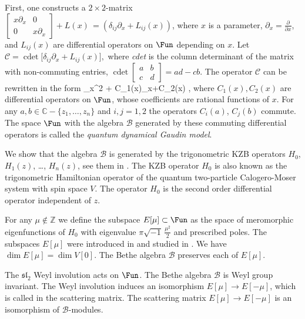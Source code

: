 \documentclass[12pt]{amsart}
\let\frak\mathfrak
\numberwithin{equation}{section}
\theoremstyle{definition}
\let\mc\mathcal
\let\der\partial
\let\on\operatorname
\def\C{{\mathbb C}}
\def\Z{{\mathbb Z}}
\def\B{{\mc B}}
\def\slt{{\frak{sl}_2}}
\begin{document}
First,  one  constructs a $2\times 2$-matrix
$\left[
\begin{matrix}
x \der_x & 0  
\\
0 & x \der_x 
\end{matrix} 
\right]+ L(x)\,
=(\delta_{ij}\der_x +  L_{ij}(x))$, 
where  $x$ is a parameter,  
$\der_x =\frac{\der}{\der x}$,
and $L_{ij}(x)$  are differential operators on $\Fun$  
depending on $x$. 
Let
$\mc C = \on{cdet}\big[\delta_{ij}\der_x +  L_{ij}(x)\big],$
where {\it cdet} is the column determinant of the matrix with non-commuting entries,
$\on{cdet}
\left[\begin{array}{cc}
a & b\\
c & d
\end{array}\right] = ad-cb.$
The operator $\mc C$ can be rewritten in the form
\bea
\der_x^2 + C_1(x)\der_x+C_2(x) ,
\eea
where $C_1(x), C_2(x)$  are differential operators on $\Fun$, whose coefficients are rational functions of $x$.
For any $a,b\in \C -\{z_1,\dots,z_n\}$ and $i,j=1,2$ the operators $C_i(a)$, $C_j(b)$ commute. 
The space $\Fun$ with the algebra
$\B$ generated by these commuting differential operators
 is called the {\it quantum dynamical Gaudin model}.

\smallskip
We show that the  algebra $\B$ is generated by the trigonometric KZB operators $H_0$,
$H_1(z)$, \dots, $H_n(z)$, see them in \cite{FW, JV}. 
The KZB operator $H_0$ is also known as the
trigonometric  Hamiltonian operator of the quantum two-particle
Calogero-Moser system with spin space $V$. The operator $H_0$
is the second order differential operator independent of $z$. 
\smallskip

For any $\mu\notin\Z$ we define the subspace $E[\mu]\subset \Fun$ as
the space of meromorphic
eigenfunctions of $H_0$ with eigenvalue $\pi \sqrt{-1}\, \frac{\mu^2}2$ and prescribed poles. The subspaces
$E[\mu]$ were introduced in \cite{FV2} and studied in \cite{JV}. We have $\dim E[\mu]=\dim V[0]$.
The Bethe algebra $\B$ preserves each of $E[\mu]$.

\smallskip
The $\slt$ Weyl involution acts on $\Fun$. The Bethe algebra $\B$ is Weyl group invariant. 
The Weyl involution induces an isomorphism  $E[\mu]\to E[-\mu]$, which is called in \cite{FV2}
the scattering matrix.  The scattering matrix 
$E[\mu]\to E[-\mu]$ is an isomorphism of $\B$-modules.
\end{document}
